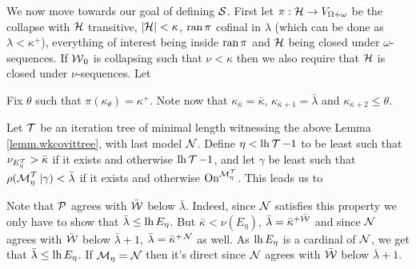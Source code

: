 
\qquad We now move towards our goal of defining $\S$. First let $\pi:\H\to V_{\Omega+\omega}$ be the collapse with $\H$ transitive, $|\H|<\kappa$, $\ran\pi$ cofinal in $\lambda$ (which can be done as $\lambda<\kappa^+$), everything of interest being inside $\ran\pi$ and $\H$ being closed under $\omega$-sequences. If $\W_0$ is collapsing such that $\nu<\kappa$ then we also require that $\H$ is closed under $\nu$-sequences. Let

Fix $\theta$ such that $\pi(\kappa_\theta)=\kappa^+$. Note now that $\kappa_{\bar\kappa}=\bar\kappa$, $\kappa_{\bar\kappa+1}=\bar\lambda$ and $\kappa_{\bar\kappa+2}\leq\theta$.


Let $\T$ be an iteration tree of minimal length witnessing the above Lemma \ref{lemm.wkcovittree}, with last model $\N$. Define $\eta<\lh\T-1$ to be least such that $\nu_{E_\eta^{\T}}>\bar\kappa$ if it exists and otherwise $\lh\T-1$, and let $\gamma$ be least such that $\rho(\M_{\eta}^{\T}|\gamma)<\bar\lambda$ if it exists and otherwise $\on^{\M_\eta^{\T}}$. This leads us to

Note that $\P$ agrees with $\bar\W$ below $\bar\lambda$. Indeed, since $\N$ satisfies this property we only have to show that $\bar\lambda\leq\lh E_\eta$. But $\bar\kappa<\nu(E_\eta)$, $\bar\lambda=\bar\kappa^{+\bar\W}$ and since $\N$ agrees with $\bar\W$ below $\bar\lambda+1$, $\bar\lambda=\bar\kappa^{+\N}$ as well. As $\lh E_\eta$ is a cardinal of $\N$, we get that $\bar\lambda\leq\lh E_\eta$. If $\M_\eta=\N$ then it's direct since $\N$ agrees with $\bar\W$ below $\bar\lambda+1$.

